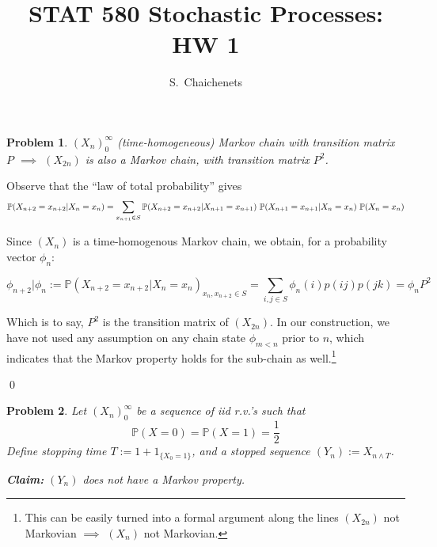 \documentclass[8pt,notitlepage]{report}
\newtheorem{problem}{Problem}
\newenvironment{solution}[1][Solution]{\begin{trivlist}
    \item[\hskip \labelsep {\bfseries #1}]}{\end{trivlist}}
\newcommand{\PP}{\mathbb{P}}
\begin{document}
\title{STAT 580 Stochastic Processes: HW 1}
\author{ S.\ Chaichenets }
\maketitle



\begin{problem}
	$(X_n)_0^\infty$ (time-homogeneous) Markov chain with transition matrix $P$  $\implies$
	$(X_{2n})$ is also a Markov chain, with transition matrix $P^2$.
\end{problem}

\begin{solution}

Observe that the ``law of total probability'' gives
\begin{equation}
\small
\PP(X_{n+2}=x_{n+2}|X_{n}=x_{n})
	=  
\sum_{x_{n+1} \in S} \PP(X_{n+2}=x_{n+2}|X_{n+1}=x_{n+1}) \ \PP(X_{n+1}=x_{n+1}|X_{n}=x_{n}) \ \PP(X_{n}=x_{n})
\end{equation}
\normalsize

Since $(X_n)$ is a time-homogenous Markov chain, we obtain, for a probability vector $\phi_n$:

\begin{equation}
\phi_{n+2} | \phi_{n} := 
\PP(X_{n+2}=x_{n+2}|X_{n}=x_{n})_{x_n,x_{n+2} \in S}
	= 
	\sum_{i,j \in S} \phi_n(i) p(ij) p(jk)
	= \phi_n P^2
\end{equation}

Which is to say, $P^2$ is the transition matrix of $(X_{2n})$. In our construction, 
we have not used any assumption on any chain state $\phi_{m < n}$ prior to $n$,
which indicates that the Markov property holds for the sub-chain 
as well.\footnote{This can be easily turned into a formal argument along the 
lines $(X_{2n})$ not Markovian $\implies$ $(X_n)$ not Markovian.}

\qed
\end{solution}


\begin{problem}
  Let $(X_n)_0^\infty$ be a sequence of iid r.v.'s such that $$ \PP(X=0) = \PP(X=1) = \frac{1}{2} $$
  Define stopping time $ T := 1 + 1_{\{X_0 = 1\} } $, and a stopped sequence $ (Y_n) := X_{n \wedge T} $.

  {\bf Claim:} $(Y_n)$ does not have a Markov property.
\end{problem}
\end{document}
